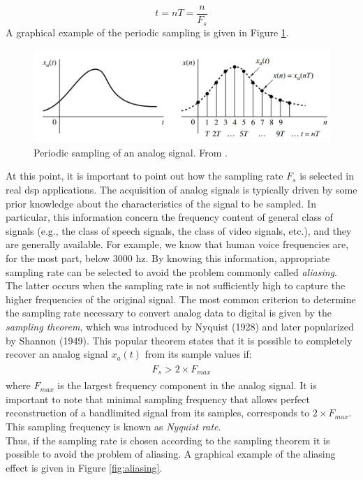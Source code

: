 \begin{equation}\label{eq:tn_relation}
	t=n T=\frac{n}{F_{s}}
\end{equation}
\noindent A graphical example of the periodic sampling is given in Figure \ref{fig:periodic_sampling}.
\begin{figure}[H]
	\begin{center}
		\includegraphics[scale=0.42]{img/periodic_sampling.png}
		\captionsetup{margin=2cm}
		\caption{ Periodic sampling of an analog signal. From \cite{proakis2006dimitris}.} 
		\label{fig:periodic_sampling}
	\end{center}
\end{figure}
\noindent At this point, it is important to point out how the sampling rate $F_s$ is selected in real \gls{dsp} applications. The acquisition of analog signals is typically driven by some prior knowledge about the characteristics of the signal to be sampled. In particular, this information concern the frequency content of general class of signals (e.g., the class of speech signals, the class of video signals, etc.), and they are generally available. For example, we know that human voice frequencies are, for the most part, below 3000 \gls{hz}. By knowing this information, appropriate sampling rate can be selected to avoid the problem commonly called \textit{aliasing}.\\
The latter occurs when the sampling rate is not sufficiently high to capture the higher frequencies of the original signal. The most common criterion to determine the sampling rate necessary to convert analog data to digital is given by the \textit{sampling theorem}, which was introduced by Nyquist (1928) and later popularized by Shannon (1949). This popular theorem states that it is possible to completely recover an analog signal $x_a(t)$ from its sample values if:
\begin{align}\label{eq:sampling_theorem}
	\begin{array}{c}
		F_s > 2\times F_{max}
	\end{array}
\end{align}
\noindent where $F_{max}$ is the largest frequency component in the analog signal. It is important to note that minimal sampling frequency that allows perfect reconstruction of a bandlimited signal from its samples, corresponds to $2\times F_{max}$. This sampling frequency is known as \textit{Nyquist rate}.\\ Thus, if the sampling rate is chosen according to the sampling theorem it is possible to avoid the problem of aliasing. A graphical example of the aliasing effect is given in Figure \ref{fig:aliasing}.

